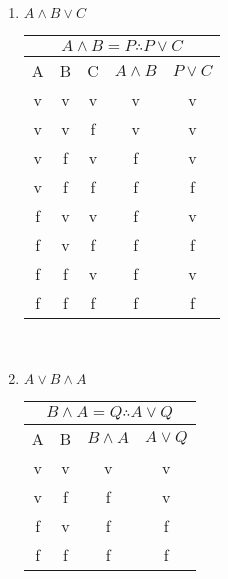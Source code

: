 	\begin{multicols}{2}
		\setlength{\columnseprule}{.5pt}
		\begin{enumerate}[label=\alph*)]
		\item $ A \wedge B \vee C $
		
		\begin{tabular}{|c|c|c|c|c|}
			\hline 
			\multicolumn{5}{|c|}{ $ A \wedge B = P \therefore P \vee C $} \\ 
			\hline 
			A	& B & C & $ A \wedge B $ & $ P \vee C $ \\ 
			\hline 
			v	& v & v & v & v \\ 
			\hline 
			v	& v & f & v & v \\ 
			\hline 
			v	& f & v & f & v \\ 
			\hline 
			v	& f & f & f & f \\ 
			\hline 
			f	& v & v & f & v \\
			\hline 
			f	& v & f & f & f \\
			\hline 
			f	& f & v & f & v \\
			\hline 
			f	& f & f & f & f \\
			\hline 
		\end{tabular} \\
		
		\columnbreak
		\item $ A \vee B \wedge A $ 
		
		\begin{tabular}{|c|c|c|c|}
			\hline 
			\multicolumn{4}{|c|}{ $ B \wedge A = Q \therefore A \vee Q $} \\ 
			\hline 
			A	& B & $ B \wedge A $ & $ A \vee Q $ \\ 
			\hline 
			v	& v & v & v \\ 
			\hline 
			v	& f & f & v \\ 
			\hline 
			f	& v & f & f \\
			\hline 
			f	& f & f & f \\
			\hline 
		\end{tabular} \\
\end{enumerate}
	\end{multicols}

\pagebreak

